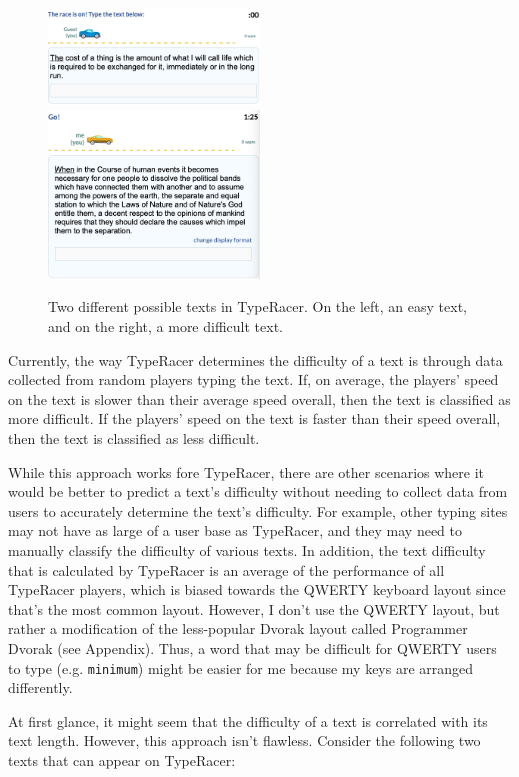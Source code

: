 \documentclass[12pt]{article}
\begin{document}
\begin{figure}[H]
	\caption{Two different possible texts in TypeRacer. On the left, an easy text, and on the right, a more difficult text.}
	\includegraphics[width=0.5\textwidth]{easy-text.png}
	\includegraphics[width=0.5\textwidth]{hard-text.png}
\end{figure}

Currently, the way TypeRacer determines the difficulty of a text is through data collected from random players typing the text. If, on average, the players' speed on the text is slower than their average speed overall, then the text is classified as more difficult. If the players' speed on the text is faster than their speed overall, then the text is classified as less difficult.

While this approach works fore TypeRacer, there are other scenarios where it would be better to predict a text's difficulty without needing to collect data from users to accurately determine the text's difficulty. For example, other typing sites may not have as large of a user base as TypeRacer, and they may need to manually classify the difficulty of various texts. In addition, the text difficulty that is calculated by TypeRacer is an average of the performance of all TypeRacer players, which is biased towards the QWERTY keyboard layout since that's the most common layout. However, I don't use the QWERTY layout, but rather a modification of the less-popular Dvorak layout called Programmer Dvorak (see Appendix). Thus, a word that may be difficult for QWERTY users to type (e.g. \texttt{minimum}) might be easier for me because my keys are arranged differently.

At first glance, it might seem that the difficulty of a text is correlated with its text length. However, this approach isn't flawless. Consider the following two texts that can appear on TypeRacer:
\end{document}
